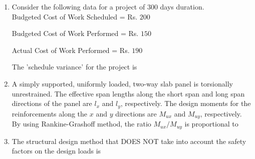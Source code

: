 \documentclass[journal,12pt,onecolumn]{article}
\theoremstyle{remark}
\begin{document}
\begin{enumerate}
    \item Consider the following data for a project of $300$ days duration.\\
    Budgeted Cost of Work Scheduled  = Rs. $200$
    
    Budgeted Cost of Work Performed  = Rs. $150$
    
    Actual Cost of Work Performed  = Rs. $190$
    
    The 'schedule variance' for the project is
    
    \hfill{}
    \begin{enumerate}
    \end{enumerate}

    \item A simply supported, uniformly loaded, two-way slab panel is torsionally
    unrestrained. The effective span lengths along the short span  and long span 
    directions of the panel are $l_x$ and $l_y$, respectively. The design moments for the
    reinforcements along the $x$ and $y$ directions are $M_{ux}$ and $M_{uy}$, respectively. By using
    Rankine-Grashoff method, the ratio $M_{ux}/M_{uy}$ is proportional to
    
    \hfill{}
    \begin{enumerate}
    \end{enumerate}
    
    \item The structural design method that DOES NOT take into account the safety factors
    on the design loads is
    
    \hfill{}
    \begin{enumerate}
    \end{enumerate}
    

\end{enumerate}
\end{document}
